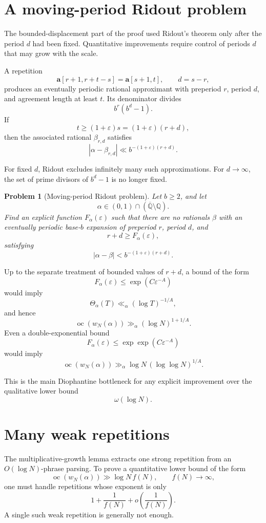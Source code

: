 \documentclass[11pt]{amsart}
\newtheorem{problem}[theorem]{Problem}
\theoremstyle{definition}
\DeclareMathOperator{\oc}{oc}
\begin{document}
\section{A moving-period Ridout problem}

The bounded-displacement part of the proof used Ridout's theorem only after the period \(d\) had been fixed. Quantitative improvements require control of periods \(d\) that may grow with the scale.

A repetition
\[
\mathbf a[r+1,r+t-s]
=
\mathbf a[s+1,t],
\qquad
d=s-r,
\]
produces an eventually periodic rational approximant with preperiod \(r\), period \(d\), and agreement length at least \(t\). Its denominator divides
\[
b^r(b^d-1).
\]
If
\[
t\geq (1+\varepsilon)s
=
(1+\varepsilon)(r+d),
\]
then the associated rational \(\beta_{r,d}\) satisfies
\[
|\alpha-\beta_{r,d}|
\ll
b^{-(1+\varepsilon)(r+d)}.
\]

For fixed \(d\), Ridout excludes infinitely many such approximations. For \(d\to\infty\), the set of prime divisors of \(b^d-1\) is no longer fixed.

\begin{problem}[Moving-period Ridout problem]
Let \(b\geq 2\), and let
\[
\alpha\in(0,1)\cap(\overline{\mathbb Q}\setminus\mathbb Q).
\]
Find an explicit function \(F_\alpha(\varepsilon)\) such that there are no rationals \(\beta\) with an eventually periodic base-\(b\) expansion of preperiod \(r\), period \(d\), and
\[
r+d\geq F_\alpha(\varepsilon),
\]
satisfying
\[
|\alpha-\beta|
<
b^{-(1+\varepsilon)(r+d)}.
\]
\end{problem}

Up to the separate treatment of bounded values of \(r+d\), a bound of the form
\[
F_\alpha(\varepsilon)\leq \exp(C\varepsilon^{-A})
\]
would imply
\[
\Theta_\alpha(T)\ll_\alpha (\log T)^{-1/A},
\]
and hence
\[
\oc(w_N(\alpha))
\gg_\alpha
(\log N)^{1+1/A}.
\]
Even a double-exponential bound
\[
F_\alpha(\varepsilon)\leq \exp\exp(C\varepsilon^{-A})
\]
would imply
\[
\oc(w_N(\alpha))
\gg_\alpha
\log N\,(\log\log N)^{1/A}.
\]

This is the main Diophantine bottleneck for any explicit improvement over the qualitative lower bound
\[
\omega(\log N).
\]

\section{Many weak repetitions}

The multiplicative-growth lemma extracts one strong repetition from an \(O(\log N)\)-phrase parsing. To prove a quantitative lower bound of the form
\[
\oc(w_N(\alpha))
\gg
\log N\,f(N),
\qquad
f(N)\to\infty,
\]
one must handle repetitions whose exponent is only
\[
1+\frac1{f(N)}+o\left(\frac1{f(N)}\right).
\]
A single such weak repetition is generally not enough.
\end{document}
